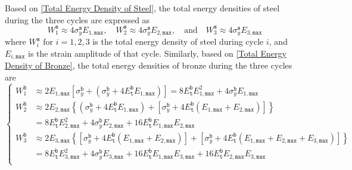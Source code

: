 \documentclass[preprint,11pt]{elsarticle}
\theoremstyle{definition}
\begin{document}
Based on \eqref{Total Energy Density of Steel}, the total energy densities of steel during the three cycles are expressed as
\begin{equation*}
    W_1^\texttt{s} \approx 4 \sigma_y^\texttt{s} E_{1,\texttt{max}},
    \quad W_2^\texttt{s} \approx 4 \sigma_y^\texttt{s} E_{2,\texttt{max}},
    \quad \text{and} \quad
    W_3^\texttt{s} \approx 4 \sigma_y^\texttt{s} E_{3,\texttt{max}}
\end{equation*}
where $W_i^\texttt{s}$ for $i=1,2,3$ is the total energy density of steel during cycle $i$, and $E_{i,\texttt{max}}$ is the strain amplitude of that cycle. Similarly, based on \eqref{Total Energy Density of Bronze}, the total energy densities of bronze during the three cycles are
\begin{equation*}
    \left\{ \begin{array}{ll}
        W_1^\texttt{b} 
        & \approx 2 E_{1,\texttt{max}} \left[ \sigma_y^\texttt{b} + (\sigma_y^\texttt{b} + 4 E_\texttt{t}^\texttt{b} E_{1,\texttt{max}}) \right]
        = 8 E_\texttt{t}^\texttt{b} E_{1,\texttt{max}}^2 + 4 \sigma_y^\texttt{b} E_{1,\texttt{max}} \\[5pt]
        
        W_2^\texttt{b} 
        & \approx 2 E_{2,\texttt{max}} \left\{ (\sigma_y^\texttt{b} + 4 E_\texttt{t}^\texttt{b} E_{1,\texttt{max}}) + \left[ \sigma_y^\texttt{b} + 4 E_\texttt{t}^\texttt{b} (E_{1,\texttt{max}} + E_{2,\texttt{max}}) \right] \right\} \\[5pt]
        & = 8 E_\texttt{t}^\texttt{b} E_{2,\texttt{max}}^2 + 4 \sigma_y^\texttt{b} E_{2,\texttt{max}} + 16 E_\texttt{t}^\texttt{b} E_{1,\texttt{max}} E_{2,\texttt{max}} \\[5pt]

        W_3^\texttt{b} 
        & \approx 2 E_{3,\texttt{max}} \left\{ \left[ \sigma_y^\texttt{b} + 4 E_\texttt{t}^\texttt{b} (E_{1,\texttt{max}} + E_{2,\texttt{max}}) \right] + \left[ \sigma_y^\texttt{b} + 4 E_\texttt{t}^\texttt{b} (E_{1,\texttt{max}} + E_{2,\texttt{max}} + E_{3,\texttt{max}}) \right] \right\} \\[5pt]
        & = 8 E_\texttt{t}^\texttt{b} E_{3,\texttt{max}}^2 + 4 \sigma_y^\texttt{b} E_{3,\texttt{max}} + 16 E_\texttt{t}^\texttt{b} E_{1,\texttt{max}} E_{3,\texttt{max}} + 16 E_\texttt{t}^\texttt{b} E_{2,\texttt{max}} E_{3,\texttt{max}} \\[5pt]
    \end{array} \right.
\end{equation*}
\end{document}
